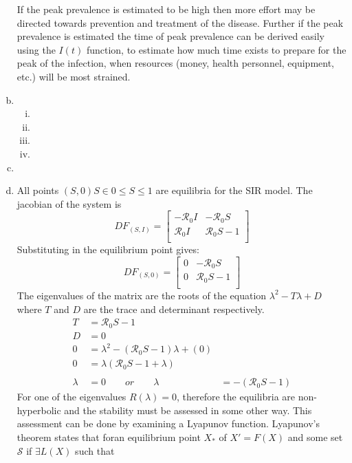 \documentclass[12pt]{article}
\begin{document}
\begin{enumerate}[(a)]
If the peak prevalence is estimated to be high then more effort may be directed towards prevention and treatment of the disease.
Further if the peak prevalence is estimated the time of peak prevalence can be derived easily using the $I(t)$ function, to estimate how much time exists to prepare for the peak of the infection, when resources (money, health personnel, equipment, etc.) will be most strained.
\item %
  \begin{enumerate}[(i)]
      \item %
      \item %
      \item %
      \item %
  \end{enumerate}
\item %
\item %
All points $(S,0) S \in 0 \leq S \leq 1$ are equilibria for the SIR model.
The jacobian of the system is
$$ DF_{(S,I)} =
\begin{bmatrix}
    -{\mathcal R_0}I & -{\mathcal R_0}S\\
     {\mathcal R_0}I &  {\mathcal R_0}S - 1\\
\end{bmatrix} $$
Substituting in the equilibrium point gives:
$$ DF_{(S,0)} =
\begin{bmatrix}
    0 & -{\mathcal R_0}S\\
    0 &  {\mathcal R_0}S - 1\\
\end{bmatrix} $$
The eigenvalues of the matrix are the roots of the equation $\lambda^2 - T\lambda + D$ where $T$ and $D$ are the trace and determinant respectively.
\begin{align*}
    T &= {\mathcal R_0}S - 1\\
    D &= 0\\
    0 &= \lambda^2 - ({\mathcal R_0}S - 1)\lambda + (0)\\
    0 &= \lambda({\mathcal R_0}S - 1 + \lambda)\\\\
    \lambda &= 0\qquad or\qquad \lambda &= -({\mathcal R_0}S - 1)
\end{align*}
For one of the eigenvalues $R(\lambda) = 0$, therefore the equilibria are non-hyperbolic and the stability must be assessed in some other way.
This assessment can be done by examining a Lyapunov function.
Lyapunov's theorem states that foran equilibrium point $X_*$ of $X'=F(X)$ and some set ${\mathcal S}$ if $\exists L(X)$ such that

\end{enumerate}
\end{document}
